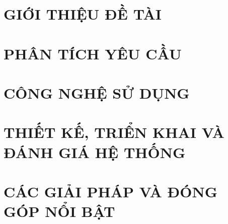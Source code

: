 \documentclass[a4paper,13pt,3p,twoside]{report}
\theoremstyle{definition}
\begin{document}
\renewcommand{\listtablename}{DANH MỤC BẢNG BIỂU}
{\let\oldnumberline\numberline
\renewcommand{\numberline}{Bảng~\oldnumberline}
\listoftables}


%  

% 


\newpage
{}

\pagestyle{fancy}
\fancyhf{}
\fancyhead[RE, LO]{\leftmark}
\fancyfoot[RE, LO]{\thepage}

\chapter{GIỚI THIỆU ĐỀ TÀI}
\label{chapter:Introduction}

\newpage
\chapter{PHÂN TÍCH YÊU CẦU}
\label{chapter:Related_works}



\newpage
\chapter{CÔNG NGHỆ SỬ DỤNG}
\label{chapter:Methodology}


\newpage
\chapter{THIẾT KẾ, TRIỂN KHAI VÀ ĐÁNH GIÁ HỆ THỐNG}
\label{chapter:Experiment}


\newpage
\chapter{CÁC GIẢI PHÁP VÀ ĐÓNG GÓP NỔI BẬT}
\label{chapter:SolutionAndContribution}

\newpage
\end{document}
